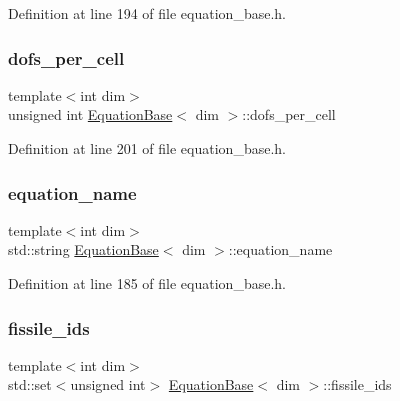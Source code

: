 Definition at line 194 of file equation\+\_\+base.\+h.

\mbox{\label{class_equation_base_a66b4cac3e416505fba70789599a98d14}} 
\subsubsection{\texorpdfstring{dofs\+\_\+per\+\_\+cell}{dofs\_per\_cell}}
{\footnotesize\ttfamily template$<$int dim$>$ \\
unsigned int \hyperlink{class_equation_base}{Equation\+Base}$<$ dim $>$\+::dofs\+\_\+per\+\_\+cell\hspace{0.3cm}{\ttfamily [protected]}}



Definition at line 201 of file equation\+\_\+base.\+h.

\mbox{\label{class_equation_base_a0a72472959e531f5256400dec911f3a5}} 
\subsubsection{\texorpdfstring{equation\+\_\+name}{equation\_name}}
{\footnotesize\ttfamily template$<$int dim$>$ \\
std\+::string \hyperlink{class_equation_base}{Equation\+Base}$<$ dim $>$\+::equation\+\_\+name\hspace{0.3cm}{\ttfamily [protected]}}



Definition at line 185 of file equation\+\_\+base.\+h.

\mbox{\label{class_equation_base_aafa902bf78cf78770557098fa9027188}} 
\subsubsection{\texorpdfstring{fissile\+\_\+ids}{fissile\_ids}}
{\footnotesize\ttfamily template$<$int dim$>$ \\
std\+::set$<$unsigned int$>$ \hyperlink{class_equation_base}{Equation\+Base}$<$ dim $>$\+::fissile\+\_\+ids\hspace{0.3cm}{\ttfamily [protected]}}



